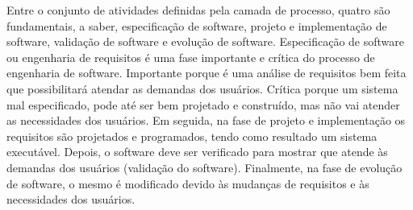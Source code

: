 Entre o conjunto de atividades definidas pela camada de processo, quatro são
fundamentais, a saber, especificação de software, projeto e implementação de
software, validação de software e evolução de software. Especificação de software
ou engenharia de requisitos é uma fase importante e crítica do processo de engenharia
de software. Importante porque é uma análise de requisitos bem feita que possibilitará
atendar as demandas dos usuários. Crítica porque um sistema mal especificado, pode até ser
bem projetado e construído, mas não vai atender as necessidades dos usuários.
Em seguida, na fase de projeto e implementação os requisitos são projetados e programados,
tendo como resultado um sistema executável. Depois, o software deve ser verificado
para mostrar que atende às demandas dos usuários (validação do software). Finalmente,
na fase de evolução de software, o mesmo é modificado devido às mudanças
de requisitos e às necessidades dos usuários.

